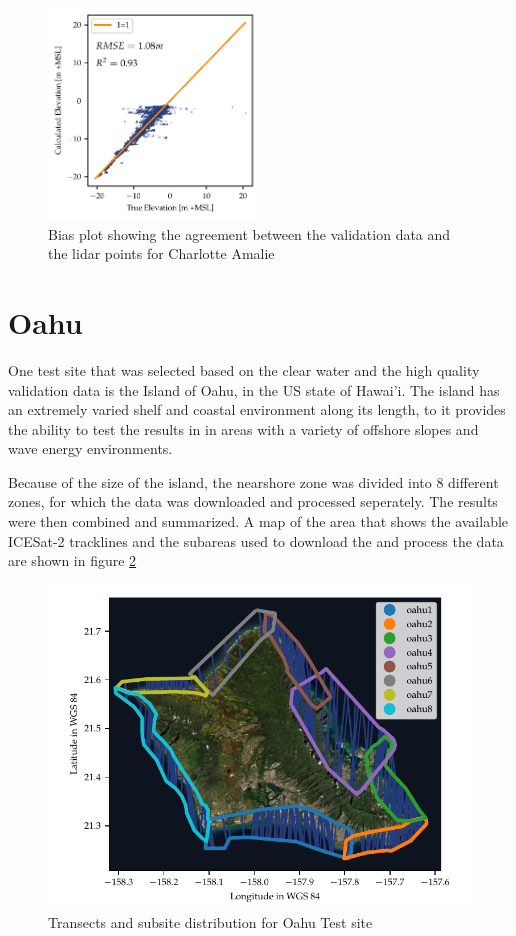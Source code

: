 \begin{figure}[h]
    \centering
    \includegraphics[width=0.5\textwidth]{figures/charlotteamalie_lidar_estimated_vs_truth.pdf}
    \caption{Bias plot showing the agreement between the validation data and the lidar points for Charlotte Amalie}
    \label{fig:charlotteamalie-lidar-bias}
\end{figure}


\section{Oahu}
One test site that was selected based on the clear water and the high quality validation data is the Island of Oahu, in the US state of Hawai'i. The island has an extremely varied shelf and coastal environment along its length, to it provides the ability to test the results in in areas with a variety of offshore slopes and wave energy environments.

Because of the size of the island, the nearshore zone was divided into 8 different zones, for which the data was downloaded and processed seperately. The results were then combined and summarized. A map of the area that shows the available ICESat-2 tracklines and the subareas used to download the and process the data are shown in figure \ref{fig:oahu-all-sites-transects}

\begin{figure}[h]
    \centering
    \includegraphics[width=\textwidth]{figures/Oahu_all_tracklines.pdf}
    \caption{Transects and subsite distribution for Oahu Test site}
    \label{fig:oahu-all-sites-transects}
\end{figure}

